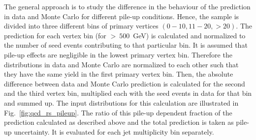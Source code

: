 \begin{itemize}
The general approach is to study the difference in the behaviour of the prediction in data and Monte Carlo for different pile-up conditions. Hence, the sample is divided into three different bins of primary vertices $(0-10, 11-20, > 20)$. The prediction for each vertex bin (for \HT $>~500$~GeV) is calculated and normalized to the number of seed events contributing to that particular bin. It is assumed that pile-up effects are negligible in the lowest primary vertex bin. Therefore the distributions in data and Monte Carlo are normalized to each other such that they have the same yield in the first primary vertex bin. Then, the absolute difference between data and Monte Carlo prediction is calculated for the second and the third vertex bin, multiplied each with the seed events in data for that bin and summed up. The input distributions for this calculation are illustrated in Fig.~\ref{fig:qcd_rs_pileup}. The ratio of this pile-up dependent fraction of the prediction calculated as described above and the total prediction is taken as pile-up uncertainty. It is evaluated for each jet multiplicity bin separately. 
\end{itemize}

